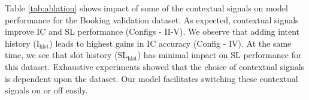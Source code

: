 
\label{sec:qualitative_f}


Table \ref{tab:ablation} shows impact of some of the contextual signals on model performance for the Booking validation dataset.
As expected, contextual signals improve IC and SL performance (Configs - II-V). We observe that adding intent history ($\text{I}_{\text{hist}}$) leads to highest gains in IC accuracy (Config - IV).
At the same time, we see that slot history ($\text{SL}_{\text{hist}}$)  has minimal impact on SL performance for this dataset.  Exhaustive experiments showed that the choice of contextual signals is dependent upon the dataset. Our model facilitates switching these contextual signals on or off easily.


